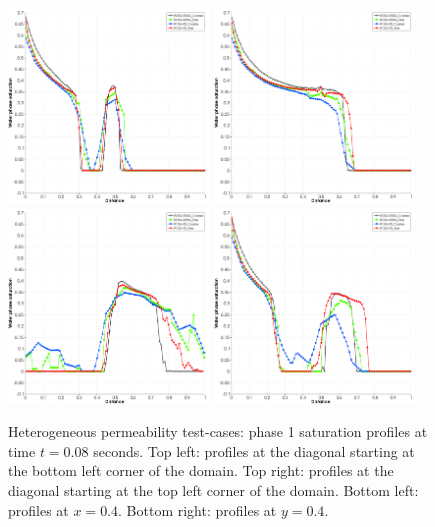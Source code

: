 \begin{figure}[h]
  \begin{center}
    \includegraphics[width=0.475\textwidth]{down_left_top_right083}
    \includegraphics[width=0.475\textwidth]{Top_left-Down_right083}
    \includegraphics[width=0.475\textwidth]{X04_083}
    \includegraphics[width=0.475\textwidth]{y04_083}
    \caption{Heterogeneous permeability test-cases: phase 1 saturation profiles at time $t=0.08$ seconds. Top left: profiles at the diagonal starting at the bottom left corner of the domain. Top right: profiles at the diagonal starting at the top left corner of the domain. Bottom left: profiles at $x=0.4$. Bottom right: profiles at $y=0.4$.\label{fig:4reg_plots}}
  \end{center}
\end{figure}



